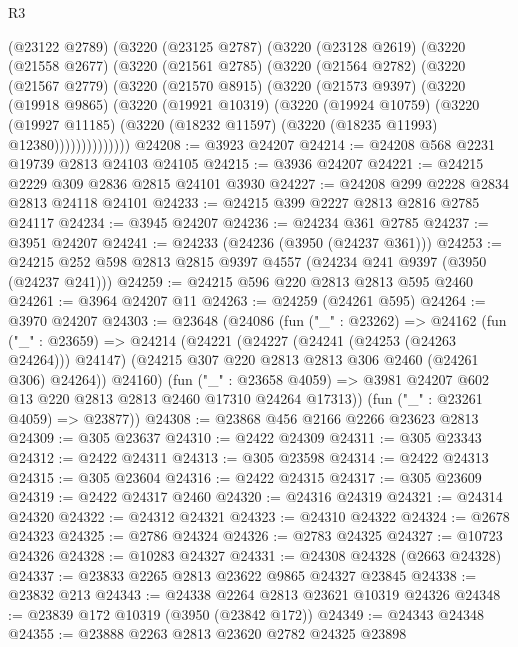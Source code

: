 \begin{lexlean}{R3}
\begin{coremodule}
    (@23122 @2789)
    (@3220
      (@23125 @2787)
      (@3220
        (@23128 @2619)
        (@3220
          (@21558 @2677)
          (@3220
            (@21561 @2785)
            (@3220
              (@21564 @2782)
              (@3220
                (@21567 @2779)
                (@3220
                  (@21570 @8915)
                  (@3220
                    (@21573 @9397)
                    (@3220
                      (@19918 @9865)
                      (@3220
                        (@19921 @10319)
                        (@3220
                          (@19924 @10759)
                          (@3220
                            (@19927 @11185)
                            (@3220 (@18232 @11597) (@3220 (@18235 @11993) @12380))))))))))))))
@24208 := @3923 @24207
@24214 := @24208 @568 @2231 @19739 @2813 @24103 @24105
@24215 := @3936 @24207
@24221 := @24215 @2229 @309 @2836 @2815 @24101 @3930
@24227 := @24208 @299 @2228 @2834 @2813 @24118 @24101
@24233 := @24215 @399 @2227 @2813 @2816 @2785 @24117
@24234 := @3945 @24207
@24236 := @24234 @361 @2785
@24237 := @3951 @24207
@24241 := @24233 (@24236 (@3950 (@24237 @361)))
@24253 := @24215 @252 @598 @2813 @2815 @9397 @4557 (@24234 @241 @9397 (@3950 (@24237 @241)))
@24259 := @24215 @596 @220 @2813 @2813 @595 @2460
@24261 := @3964 @24207 @11
@24263 := @24259 (@24261 @595)
@24264 := @3970 @24207
@24303 := @23648
    (@24086
      (fun ("_" : @23262) =>
      @24162
        (fun ("_" : @23659) =>
        @24214
          (@24221
            (@24227 (@24241 (@24253 (@24263 @24264))) @24147)
            (@24215 @307 @220 @2813 @2813 @306 @2460 (@24261 @306) @24264))
          @24160)
        (fun ("_" : @23658 @4059) =>
        @3981 @24207 @602 @13 @220 @2813 @2813 @2460 @17310 @24264 @17313))
      (fun ("_" : @23261 @4059) => @23877))
@24308 := @23868 @456 @2166 @2266 @23623 @2813
@24309 := @305 @23637
@24310 := @2422 @24309
@24311 := @305 @23343
@24312 := @2422 @24311
@24313 := @305 @23598
@24314 := @2422 @24313
@24315 := @305 @23604
@24316 := @2422 @24315
@24317 := @305 @23609
@24319 := @2422 @24317 @2460
@24320 := @24316 @24319
@24321 := @24314 @24320
@24322 := @24312 @24321
@24323 := @24310 @24322
@24324 := @2678 @24323
@24325 := @2786 @24324
@24326 := @2783 @24325
@24327 := @10723 @24326
@24328 := @10283 @24327
@24331 := @24308 @24328 (@2663 @24328)
@24337 := @23833 @2265 @2813 @23622 @9865 @24327 @23845
@24338 := @23832 @213
@24343 := @24338 @2264 @2813 @23621 @10319 @24326
@24348 := @23839 @172 @10319 (@3950 (@23842 @172))
@24349 := @24343 @24348
@24355 := @23888 @2263 @2813 @23620 @2782 @24325 @23898

\end{coremodule}
\end{lexlean}
